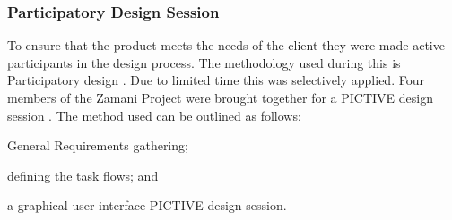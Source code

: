 \documentclass[12pt,a4paper]{report}
\begin{document}
\subsubsection{Participatory Design Session}

To ensure that the product meets the needs of the client they were made active participants
in the design process. The methodology used during this is Participatory design
\cite{muller1993participatory}. Due to limited time this was selectively applied.
Four members of the Zamani Project were
brought together for a PICTIVE design session \cite{muller1991pictive}.
The method used can be outlined as follows:
\begin{inparaenum}[(i)]
\item General Requirements gathering;
\item defining the task flows; and
\item a graphical user interface PICTIVE design session.
\end{inparaenum}
\end{document}
